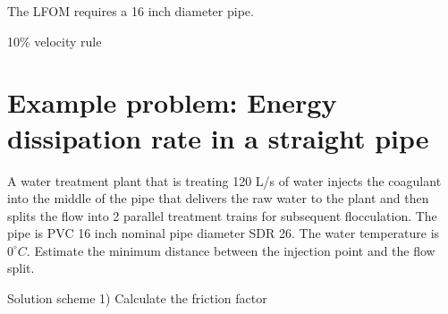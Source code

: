 \documentclass[letterpaper,10pt,english]{sphinxmanual}
\begin{document}
The LFOM requires a 16 inch diameter pipe.

10\% velocity rule

%
\begin{sphinxVerbatim}[commandchars=\\\{\}]
  
  
\end{sphinxVerbatim}


\section{Example problem: Energy dissipation rate in a straight pipe}
\label{\detokenize{Rapid_Mix/RM_Examples:example-problem-energy-dissipation-rate-in-a-straight-pipe}}
A water treatment plant that is treating 120 L/s of water injects the coagulant into the middle of the pipe that delivers the raw water to the plant and then splits the flow into 2 parallel treatment trains for subsequent flocculation. The pipe is PVC 16 inch nominal pipe diameter SDR 26. The water temperature is \(0^{\circ}C\). Estimate the minimum distance between the injection point and the flow split.

Solution scheme 1) Calculate the friction factor
\end{document}
